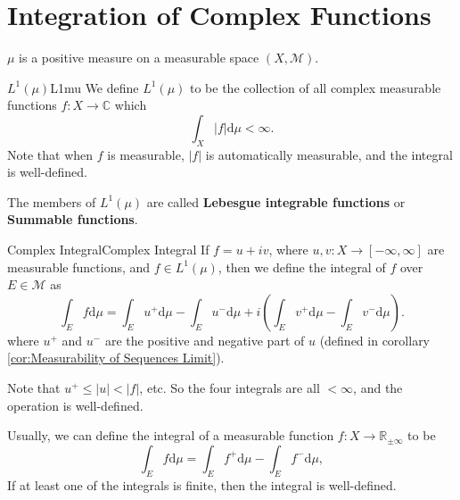 \documentclass[../main.tex]{subfiles}
\begin{document}
\section{Integration of Complex Functions}
$\mu$ is a positive measure on a measurable space $(X, \mathcal{M})$.

\begin{notation}{$L^1(\mu)$}{L1mu}
We define $L^1(\mu)$ to be the collection of all complex measurable functions $f: X \rightarrow \mathbb{C}$ which
\begin{equation}
\int_X \left|f\right| \mathrm{d} \mu < \infty.
\end{equation}
Note that when $f$ is measurable, $\left|f\right|$ is automatically measurable, and the integral is well-defined.
\end{notation}

The members of $L^1(\mu)$ are called \textbf{Lebesgue integrable functions} or \textbf{Summable functions}.

\begin{definition}{Complex Integral}{Complex Integral}
	If $f=u+iv$, where $u,v: X \rightarrow [-\infty ,\infty ]$ are measurable functions, and $f\in L^1(\mu)$, then we define the integral of $f$ over $E\in \mathcal{M}$ as
	\begin{equation}
		\int_E f \mathrm{d} \mu = \int_E u^+ \mathrm{d} \mu - \int_E u^- \mathrm{d} \mu + i\left( \int_E v^+ \mathrm{d} \mu - \int_E v^- \mathrm{d} \mu \right).
	\end{equation}
	where $u^+$ and $u^-$ are the positive and negative part of $u$ (defined in corollary \ref{cor:Measurability of Sequences Limit}).

	Note that $u^+\leq \left|u\right|< \left|f\right|$, etc. So the four integrals are all $< \infty $, and the operation is well-defined.
\end{definition}

Usually, we can define the integral of a measurable function $f: X \rightarrow \mathbb{R}_{\pm \infty }$ to be
\begin{equation}
	\int_E f \mathrm{d} \mu = \int_E f^+ \mathrm{d} \mu - \int_E f^- \mathrm{d} \mu,
\end{equation}
If at least one of the integrals is finite, then the integral is well-defined.
\end{document}
